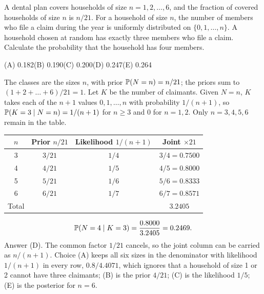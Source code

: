 \begin{example}
A dental plan covers households of size $n = 1, 2, \dots, 6$, and the fraction of covered
households of size $n$ is $n/21$. For a household of size $n$, the number of members who
file a claim during the year is uniformly distributed on $\{0, 1, \dots, n\}$. A household
chosen at random has exactly three members who file a claim. Calculate the probability that
the household has four members.
\par\smallskip\noindent (A) 0.182\qquad (B) 0.190\qquad (C) 0.200\qquad (D) 0.247\qquad (E) 0.264
\end{example}
\begin{solution}
The classes are the sizes $n$, with prior $\mathbb{P}(N = n) = n/21$; the priors sum to
$(1 + 2 + \dots + 6)/21 = 1$. Let $K$ be the number of claimants. Given $N = n$, $K$ takes
each of the $n + 1$ values $0, 1, \dots, n$ with probability $1/(n+1)$, so
$\mathbb{P}(K = 3 \mid N = n) = 1/(n+1)$ for $n \geq 3$ and $0$ for $n = 1, 2$. Only $n = 3, 4, 5, 6$
remain in the table.
\begin{center}
\begin{tabular}{@{}cccc@{}}
\toprule
$n$ & Prior $n/21$ & Likelihood $1/(n+1)$ & Joint $\times 21$ \\
\midrule
3 & $3/21$ & $1/4$ & $3/4 = 0.7500$ \\
4 & $4/21$ & $1/5$ & $4/5 = 0.8000$ \\
5 & $5/21$ & $1/6$ & $5/6 = 0.8333$ \\
6 & $6/21$ & $1/7$ & $6/7 = 0.8571$ \\
\midrule
Total & & & $3.2405$ \\
\bottomrule
\end{tabular}
\end{center}
\[
\mathbb{P}(N = 4 \mid K = 3) = \frac{0.8000}{3.2405} = 0.2469.
\]
Answer (D). The common factor $1/21$ cancels, so the joint column can be carried as
$n/(n+1)$. Choice (A) keeps all six sizes in the denominator with likelihood $1/(n+1)$ in
every row, $0.8/4.4071$, which ignores that a household of size 1 or 2 cannot have three
claimants; (B) is the prior $4/21$; (C) is the likelihood $1/5$; (E) is the posterior for
$n = 6$.
\end{solution}

